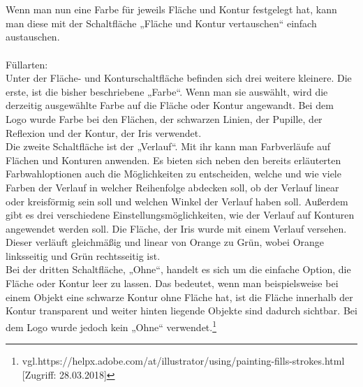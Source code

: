 \leavevmode \\
\leavevmode \\
Wenn man nun eine Farbe für jeweils Fläche und Kontur festgelegt hat, kann man diese mit der Schaltfläche „Fläche und Kontur vertauschen“ einfach austauschen.
\leavevmode \\
\leavevmode \\
Füllarten:
\leavevmode \\
Unter der Fläche- und Konturschaltfläche befinden sich drei weitere kleinere. Die erste, ist die bisher beschriebene „Farbe“. Wenn man sie auswählt, wird die derzeitig ausgewählte Farbe auf die Fläche oder Kontur angewandt. Bei dem Logo wurde Farbe bei den Flächen, der schwarzen Linien, der Pupille, der Reflexion und der Kontur, der Iris verwendet.
\leavevmode \\
Die zweite Schaltfläche ist der „Verlauf“. Mit ihr kann man Farbverläufe auf Flächen und Konturen anwenden. Es bieten sich neben den bereits erläuterten Farbwahloptionen auch die Möglichkeiten zu entscheiden, welche und wie viele Farben der Verlauf in welcher Reihenfolge abdecken soll, ob der Verlauf linear oder kreisförmig sein soll und welchen Winkel der Verlauf haben soll. Außerdem gibt es drei verschiedene Einstellungsmöglichkeiten, wie der Verlauf auf Konturen angewendet werden soll. Die Fläche, der Iris wurde mit einem Verlauf versehen. Dieser verläuft gleichmäßig und linear von Orange zu Grün, wobei Orange linksseitig und Grün rechtsseitig ist.
\leavevmode \\
Bei der dritten Schaltfläche, „Ohne“, handelt es sich um die einfache Option, die Fläche oder Kontur leer zu lassen. Das bedeutet, wenn man beispielsweise bei einem Objekt eine schwarze Kontur ohne Fläche hat, ist die Fläche innerhalb der Kontur transparent und weiter hinten liegende Objekte sind dadurch sichtbar. Bei dem Logo wurde jedoch kein „Ohne“ verwendet.\footnote{\label{} vgl.https://helpx.adobe.com/at/illustrator/using/painting-fills-strokes.html [Zugriff: 28.03.2018]}

